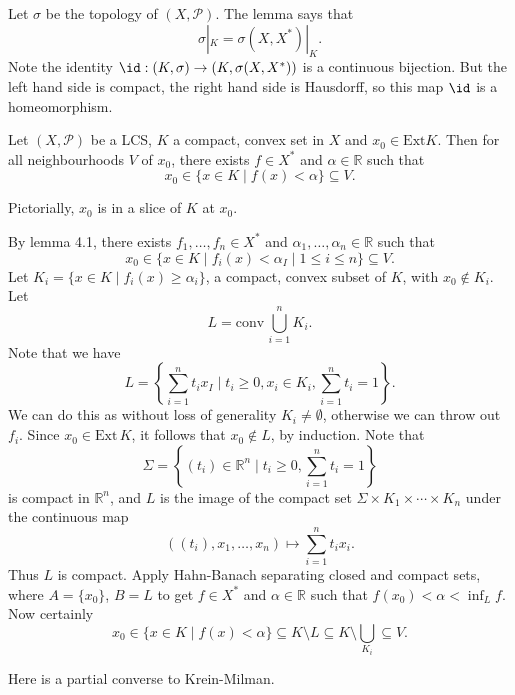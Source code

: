 \documentclass[12pt]{article}
\begin{document}
\begin{proofbox}
	Let $\sigma$ be the topology of $(X, \mathcal{P})$. The lemma says that
	\[
	\sigma|_K = \sigma(X, X^{\ast})|_K.
	\]
	Note the identity $\id : (K, \sigma) \to (K, \sigma(X, X^{\ast}))$ is a continuous bijection. But the left hand side is compact, the right hand side is Hausdorff, so this map $\id$ is a homeomorphism.
\end{proofbox}


\begin{lemma}
	Let $(X, \mathcal{P})$ be a LCS, $K$ a compact, convex set in $X$ and $x_0 \in \mathrm{Ext} K$. Then for all neighbourhoods $V$ of $x_0$, there exists $f \in X^{\ast}$ and $\alpha \in \mathbb{R}$ such that
	\[
		x_0 \in \{x \in K \mid f(x) < \alpha\} \subseteq V.
	\]
\end{lemma}

Pictorially, $x_0$ is in a slice of $K$ at $x_0$.

\begin{proofbox}
	By lemma 4.1, there exists $f_1, \ldots, f_n \in X^{\ast}$ and $\alpha_1, \ldots, \alpha_n \in \mathbb{R}$ such that
	\[
		x_0 \in \{ x \in K \mid f_i(x) < \alpha_I \mid 1 \leq i \leq n\} \subseteq V.
	\]
	Let $K_i = \{x \in K \mid f_i(x) \geq \alpha_i\}$, a compact, convex subset of $K$, with $x_0 \not \in K_i$. Let
	\[
	L = \mathrm{conv} \, \bigcup_{i = 1}^n K_i.
	\]
	Note that we have
	\[
		L = \left\{ \sum_{i = 1}^n t_i x_I \mid t_i \geq 0, x_i \in K_i, \sum_{i = 1}^n t_i = 1 \right\}.
	\]
	We can do this as without loss of generality $K_i \neq \emptyset$, otherwise we can throw out $f_i$. Since $x_0 \in \mathrm{Ext} \, K$, it follows that $x_0 \not \in L$, by induction. Note that
	\[
		\Sigma = \left\{ (t_i) \in \mathbb{R}^n \mid t_i \geq 0, \sum_{i = 1}^n t_i = 1 \right\}
	\]
	is compact in $\mathbb{R}^n$, and $L$ is the image of the compact set $\Sigma \times K_1 \times \cdots \times K_n$ under the continuous map
	\[
		((t_i), x_1, \ldots, x_n) \mapsto \sum_{i = 1}^n t_i x_i.
	\]
	Thus $L$ is compact. Apply Hahn-Banach separating closed and compact sets, where $A = \{x_0\}$, $B = L$ to get $f \in X^{\ast}$ and $\alpha \in \mathbb{R}$ such that $f(x_0) < \alpha < \inf_L f$. Now certainly
	 \[
		 x_0 \in \{x \in K \mid f(x) < \alpha\} \subseteq K \setminus L \subseteq K \setminus \bigcup_{K_i} \subseteq V.
	\]
\end{proofbox}

Here is a partial converse to Krein-Milman.
\end{document}
